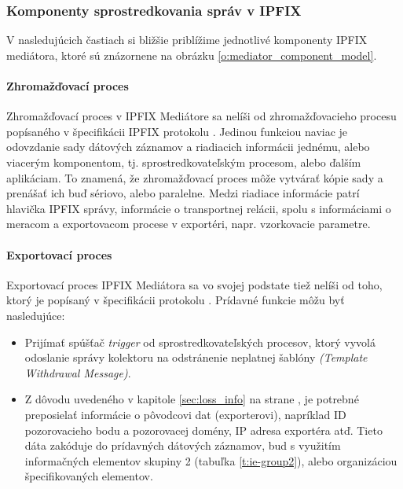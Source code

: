 \subsubsection{Komponenty sprostredkovania správ v IPFIX}

V nasledujúcich častiach si bližšie priblížime jednotlivé komponenty IPFIX mediátora, ktoré sú
znázornene na obrázku \ref{o:mediator_component_model}.

\paragraph{Zhromažďovací proces}

Zhromažďovací proces v IPFIX Mediátore sa nelíši od zhromažďovacieho procesu popísaného v 
špecifikácii IPFIX protokolu \citep{rfc5101}.
Jedinou funkciou naviac je odovzdanie sady dátových záznamov a riadiacich informácii jednému, alebo 
viacerým komponentom, tj. sprostredkovateľským procesom, alebo ďalším aplikáciam. 
To znamená, že zhromažďovací proces môže vytvárať kópie sady a prenášať ich buď sériovo, alebo paralelne.  
Medzi riadiace informácie patrí hlavička IPFIX správy, informácie o transportnej relácii, 
spolu s informáciami o meracom a exportovacom procese v exportéri, napr. vzorkovacie parametre.

\paragraph{Exportovací proces} \label{sec:exporting_process}

Exportovací proces IPFIX Mediátora sa vo svojej podstate tiež nelíši od toho, ktorý je popísaný v špecifikácii
protokolu \citep{rfc5101}.
Prídavné funkcie môžu byť nasledujúce:
\begin{itemize}
 \item Prijímať spúšťač \emph{trigger} od sprostredkovateľských procesov, ktorý vyvolá odoslanie správy
 kolektoru na odstránenie neplatnej šablóny \emph{(Template Withdrawal Message)}.
 \item Z dôvodu uvedeného v kapitole \ref{sec:loss_info} na strane \pageref{sec:loss_info}, je potrebné 
 preposielať informácie o pôvodcovi dat (exporterovi), napríklad ID pozorovacieho bodu a pozorovacej 
 domény, IP adresa exportéra atď. Tieto dáta zakóduje do prídavných dátových záznamov, bud s využitím 
 informačných elementov skupiny 2 (tabuľka \ref{t:ie-group2}), alebo organizáciou špecifikovaných 
 elementov.
\end{itemize}


